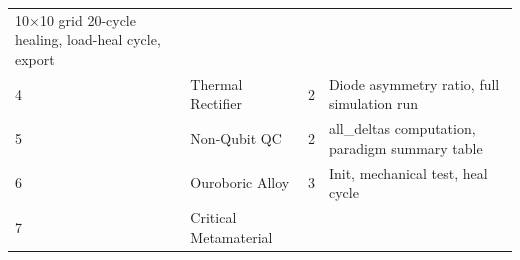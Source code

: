 \documentclass[12pt,a4paper]{article}
\begin{document}
\begin{longtable}[]{@{}llll@{}}
\begin{minipage}[t]{0.29\columnwidth}
10×10 grid 20-cycle healing, load-heal cycle, export\strut
\end{minipage}\tabularnewline
\begin{minipage}[t]{0.09\columnwidth}\raggedright
4\strut
\end{minipage} & \begin{minipage}[t]{0.31\columnwidth}\raggedright
Thermal Rectifier\strut
\end{minipage} & \begin{minipage}[t]{0.20\columnwidth}\raggedright
2\strut
\end{minipage} & \begin{minipage}[t]{0.29\columnwidth}\raggedright
Diode asymmetry ratio, full simulation run\strut
\end{minipage}\tabularnewline
\begin{minipage}[t]{0.09\columnwidth}\raggedright
5\strut
\end{minipage} & \begin{minipage}[t]{0.31\columnwidth}\raggedright
Non-Qubit QC\strut
\end{minipage} & \begin{minipage}[t]{0.20\columnwidth}\raggedright
2\strut
\end{minipage} & \begin{minipage}[t]{0.29\columnwidth}\raggedright
all\_deltas computation, paradigm summary table\strut
\end{minipage}\tabularnewline
\begin{minipage}[t]{0.09\columnwidth}\raggedright
6\strut
\end{minipage} & \begin{minipage}[t]{0.31\columnwidth}\raggedright
Ouroboric Alloy\strut
\end{minipage} & \begin{minipage}[t]{0.20\columnwidth}\raggedright
3\strut
\end{minipage} & \begin{minipage}[t]{0.29\columnwidth}\raggedright
Init, mechanical test, heal cycle\strut
\end{minipage}\tabularnewline
\begin{minipage}[t]{0.09\columnwidth}\raggedright
7\strut
\end{minipage} & \begin{minipage}[t]{0.31\columnwidth}\raggedright
Critical Metamaterial\strut
\end{minipage} & \begin{minipage}[t]{0.20\columnwidth}\raggedright

\end{minipage}
\end{longtable}
\end{document}
